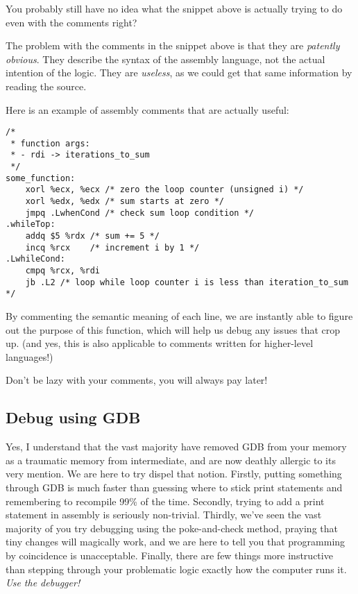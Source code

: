 \documentclass[11pt]{article}
\begin{document}
You probably still have no idea what the snippet above is actually trying to do even with
the comments right?

The problem with the comments in the snippet above is that they are \emph{patently
obvious}. They describe the syntax of the assembly language, not the actual intention of
the logic. They are \emph{useless}, as we could get that same  information by reading the
source.

Here is an example of assembly comments that are actually useful:

\begin{lstlisting}[caption={Good: \emph{semantic} comments}, captionpos=b]
/*
 * function args:
 * - rdi -> iterations_to_sum
 */
some_function:
    xorl %ecx, %ecx /* zero the loop counter (unsigned i) */
    xorl %edx, %edx /* sum starts at zero */
    jmpq .LwhenCond /* check sum loop condition */
.whileTop:
    addq $5 %rdx /* sum += 5 */
    incq %rcx    /* increment i by 1 */
.LwhileCond:
    cmpq %rcx, %rdi
    jb .L2 /* loop while loop counter i is less than iteration_to_sum */
\end{lstlisting}

By commenting the semantic meaning of each line, we are instantly able to figure out the
purpose of this function, which will help us debug any issues that crop up. (and yes, this
is also applicable to comments written for higher-level languages!)

Don't be lazy with your comments, you will always pay later!

\subsection{Debug using GDB}

Yes, I understand that the vast majority have removed GDB from your memory as a traumatic
memory from intermediate, and are now deathly allergic to its very mention. We are here to
try dispel that notion. Firstly, putting something through GDB is much faster than
guessing where to stick print statements and remembering to recompile 99\% of the time.
Secondly, trying to add a print statement in assembly is seriously non-trivial. Thirdly,
we've seen the vast majority of you try debugging using the poke-and-check method, praying
that tiny changes will magically work, and we are here to tell you that programming by
coincidence is unacceptable. Finally, there are few things more instructive than stepping
through your problematic logic exactly how the computer runs it. \emph{Use the debugger!}
\end{document}

